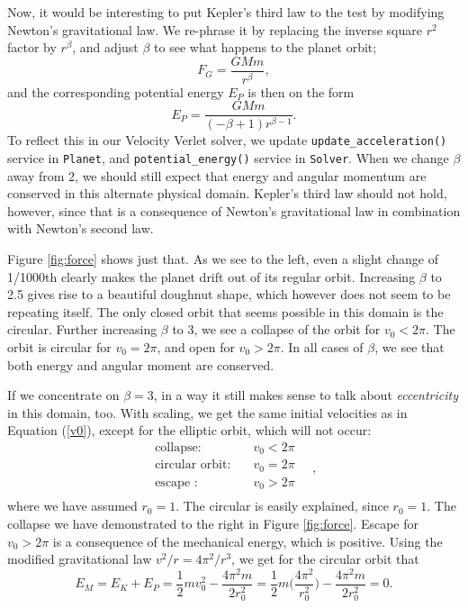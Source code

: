 \documentclass[]{article}
\begin{document}
Now, it would be interesting to put Kepler's third law to the test by modifying Newton's gravitational law. We re-phrase it by replacing the inverse square $r^2$ factor by $r^{\beta}$, and adjust $\beta$ to see what happens to the planet orbit;
\begin{equation}
	F_G = \frac{GMm}{r^{\beta}},
\end{equation}
and the corresponding potential energy $E_P$ is then on the form
\begin{equation} \label{newton-grav-alt}
	E_P = \frac{GMm}{(-\beta+1)r^{\beta-1}}.
\end{equation}
To reflect this in our Velocity Verlet solver, we update \lstinline|update_acceleration()| service in \lstinline|Planet|, and  \lstinline|potential_energy()| service in \lstinline|Solver|. When we change $\beta$ away from 2, we should still expect that energy and angular momentum are conserved in this alternate physical domain. Kepler's third law should not hold, however, since that is a consequence of Newton's gravitational law in combination with Newton's second law. 

Figure \ref{fig:force} shows just that. As we see to the left, even a slight change of 1/1000th clearly makes the planet drift out of its regular orbit. Increasing $\beta$ to 2.5 gives rise to a beautiful doughnut shape, which however does not seem to be repeating itself. The only closed orbit that seems possible in this domain is the circular. Further increasing $\beta$ to 3, we see a collapse of the orbit for $v_0 < 2\pi$. The orbit is circular for $v_0 = 2\pi$, and open for $v_0 > 2\pi$. In all cases of $\beta$, we see that both energy and angular moment are conserved.

If we concentrate on $\beta = 3$, in a way it still makes sense to talk about \textit{eccentricity} in this domain, too. With scaling, we get the same initial velocities as in Equation (\ref{v0}), except for the elliptic orbit, which will not occur:
\begin{equation} \label{v0_beta3}
\begin{aligned}
	\text{collapse:}& \quad v_0 < 2 \pi \\
	\text{circular orbit:}& \quad v_0 = 2 \pi \\
	\text{escape :}& \quad v_0 > 2 \pi \\
\end{aligned} \quad,
\end{equation}
where we have assumed $r_0 = 1$. The circular is easily explained, since $r_0 = 1$. The collapse we have demonstrated to the right in Figure \ref{fig:force}. Escape for $v_0 > 2\pi$ is a consequence of the mechanical energy, which is positive. Using the modified gravitational law $v^2/r = 4\pi^2/r^3$, we get for the circular orbit that
\begin{equation}
	E_M = E_K + E_P = \frac{1}{2}mv_0^2 - \frac{4\pi^2 m}{2r_0^2} = \frac{1}{2}m \bigg(\frac{4\pi^2}{r_0^2} \bigg) - \frac{4\pi^2 m}{2r_0^2} = 0.
\end{equation}
\end{document}
